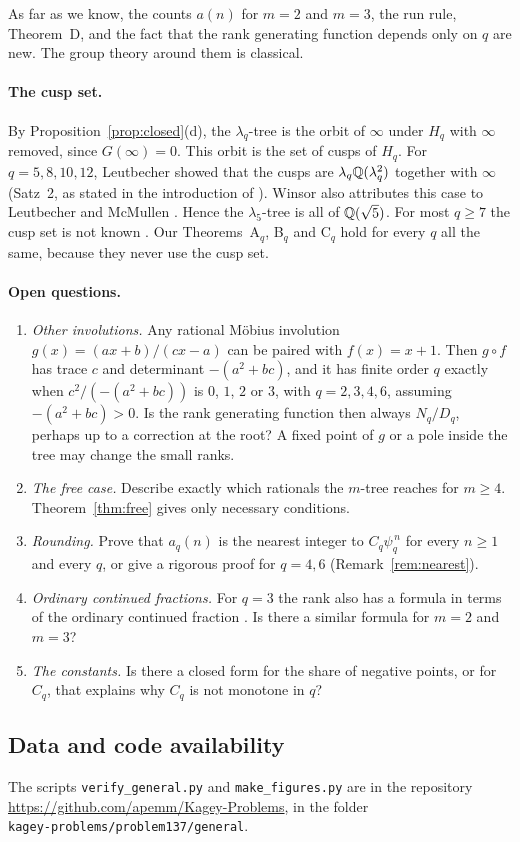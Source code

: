 As far as we know, the counts $a(n)$ for $m=2$ and $m=3$, the run rule, Theorem~D, and the fact that the
rank generating function depends only on $q$ are new. The group theory around them is classical.

\paragraph{The cusp set.} By Proposition~\ref{prop:closed}(d), the $\lambda_q$-tree is the orbit of
$\infty$ under $H_q$ with $\infty$ removed, since $G(\infty)=0$. This orbit is the set of cusps of $H_q$.
For $q=5,8,10,12$, Leutbecher showed that the cusps are $\lambda_q\mathbb{Q}(\lambda_q^2)$ together with $\infty$
(Satz~2, as stated in the introduction of \cite{leutbecher1974}). Winsor also attributes this case to
Leutbecher and McMullen \cite{winsor}. Hence the $\lambda_5$-tree is
all of $\mathbb{Q}(\sqrt5)$. For most $q\ge7$ the cusp set is not known \cite{rosen-schmidt,winsor}. Our
Theorems~A$_q$, B$_q$ and C$_q$ hold for every $q$ all the same, because they never use the cusp set.

\paragraph{Open questions.}
\begin{enumerate}[itemsep=2pt,topsep=3pt]
\item \emph{Other involutions.} Any rational M\"obius involution $g(x)=(ax+b)/(cx-a)$ can be paired with
$f(x)=x+1$. Then $g\circ f$ has trace $c$ and determinant $-(a^2+bc)$, and it has finite order $q$
exactly when $c^2/(-(a^2+bc))$ is $0$, $1$, $2$ or $3$, with $q=2,3,4,6$, assuming $-(a^2+bc)>0$. Is the rank generating function
then always $N_q/D_q$, perhaps up to a correction at the root? A fixed point of $g$ or a pole inside
the tree may change the small ranks.
\item \emph{The free case.} Describe exactly which rationals the $m$-tree reaches for $m\ge4$.
Theorem~\ref{thm:free} gives only necessary conditions.
\item \emph{Rounding.} Prove that $a_q(n)$ is the nearest integer to $C_q\psi_q^{\,n}$ for every $n\ge1$
and every $q$, or give a rigorous proof for $q=4,6$ (Remark~\ref{rem:nearest}).
\item \emph{Ordinary continued fractions.} For $q=3$ the rank also has a formula in terms of the
ordinary continued fraction \cite[Theorem~4.8]{P137}. Is there a similar formula for $m=2$ and $m=3$?
\item \emph{The constants.} Is there a closed form for the share of negative points, or for $C_q$, that
explains why $C_q$ is not monotone in $q$?
\end{enumerate}

\subsection*{Data and code availability}
The scripts \texttt{verify\_general.py} and \texttt{make\_figures.py} are in the repository
\url{https://github.com/apemm/Kagey-Problems}, in the folder\\
\texttt{kagey-problems/problem137/general}.
